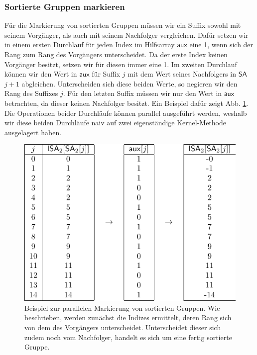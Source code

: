 \subsubsection{Sortierte Gruppen markieren}
Für die Markierung von sortierten Gruppen müssen wir ein Suffix sowohl mit seinem Vorgänger, als auch mit seinem Nachfolger vergleichen. Dafür setzen wir in einem ersten Durchlauf für jeden Index im Hilfsarray $\mathsf{aux}$ eine 1, wenn sich der Rang zum Rang des Vorgängers unterscheidet. Da der erste Index keinen Vorgänger besitzt, setzen wir für diesen immer eine 1. Im zweiten Durchlauf können wir den Wert in $\mathsf{aux}$ für Suffix $j$ mit dem Wert seines Nachfolgers in $\mathsf{SA}$ $j+1$ abgleichen. Unterscheiden sich diese beiden Werte, so negieren wir den Rang des Suffixes $j$. Für den letzten Suffix müssen wir nur den Wert in $\mathsf{aux}$ betrachten, da dieser keinen Nachfolger besitzt. Ein Beispiel dafür zeigt Abb. \ref{osipov:mark}.
Die Operationen beider Durchläufe können parallel ausgeführt werden, weshalb wir diese beiden Durchläufe naiv auf zwei eigenständige Kernel-Methode ausgelagert haben.
\begin{center}
\begin{figure}
\includegraphics[scale=1]{kapitel/saca_algorithmen/osipov/mark_singletons_example.pdf}
\caption{Beispiel zur parallelen Markierung von sortierten Gruppen. Wie beschrieben, werden zunächst die Indizes ermittelt, deren Rang sich von dem des Vorgängers unterscheidet. Unterscheidet dieser sich zudem noch vom Nachfolger, handelt es sich um eine fertig sortierte Gruppe.}
\label{osipov:mark}
\end{figure}

\end{center}
